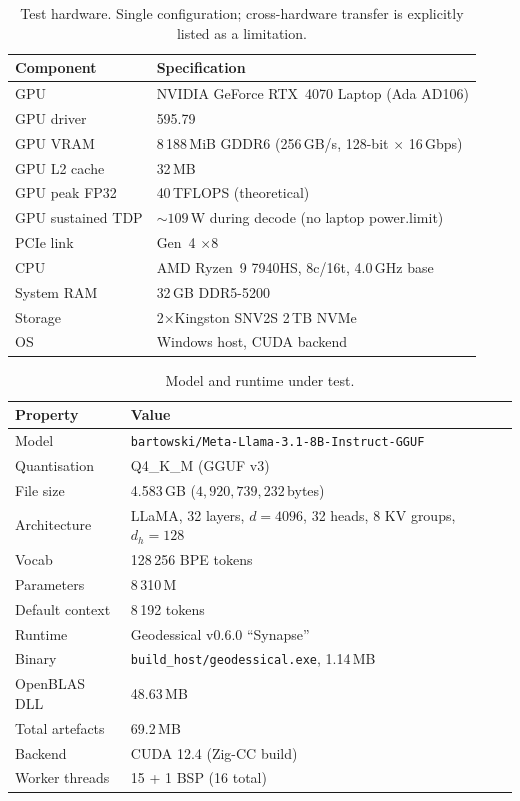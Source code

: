 \documentclass[11pt]{article}
\begin{document}
\begin{table}[h]\centering\footnotesize
\caption{Test hardware. Single configuration; cross-hardware transfer is
explicitly listed as a limitation.}
\begin{tabular}{@{}ll@{}}
\toprule
Component & Specification\\
\midrule
GPU                 & NVIDIA GeForce RTX~4070 Laptop (Ada AD106)\\
GPU driver          & 595.79\\
GPU VRAM            & 8\,188\,MiB GDDR6 (256\,GB/s, 128-bit $\times$ 16\,Gbps)\\
GPU L2 cache        & 32\,MB\\
GPU peak FP32       & 40\,TFLOPS (theoretical)\\
GPU sustained TDP   & ${\sim}109$\,W during decode (no laptop power.limit)\\
PCIe link           & Gen~4 $\times$8\\
CPU                 & AMD Ryzen~9 7940HS, 8c/16t, 4.0\,GHz base\\
System RAM          & 32\,GB DDR5-5200\\
Storage             & 2$\times$Kingston SNV2S 2\,TB NVMe\\
OS                  & Windows host, CUDA backend\\
\bottomrule
\end{tabular}
\end{table}

\begin{table}[h]\centering\footnotesize
\caption{Model and runtime under test.}
\begin{tabular}{@{}ll@{}}
\toprule
Property & Value\\
\midrule
Model               & \texttt{bartowski/Meta-Llama-3.1-8B-Instruct-GGUF}\\
Quantisation        & Q4\_K\_M (GGUF v3)\\
File size           & 4.583\,GB ($4{,}920{,}739{,}232$\,bytes)\\
Architecture        & LLaMA, 32 layers, $d{=}4096$, 32 heads, 8 KV groups, $d_h{=}128$\\
Vocab               & 128\,256 BPE tokens\\
Parameters          & 8\,310\,M\\
Default context     & 8\,192 tokens\\
\midrule
Runtime             & Geodessical v0.6.0 ``Synapse''\\
Binary              & \texttt{build\_host/geodessical.exe}, 1.14\,MB\\
OpenBLAS DLL        & 48.63\,MB\\
Total artefacts     & 69.2\,MB\\
Backend             & CUDA 12.4 (Zig-CC build)\\
Worker threads      & 15 + 1 BSP (16 total)\\
\bottomrule
\end{tabular}
\end{table}
\end{document}

